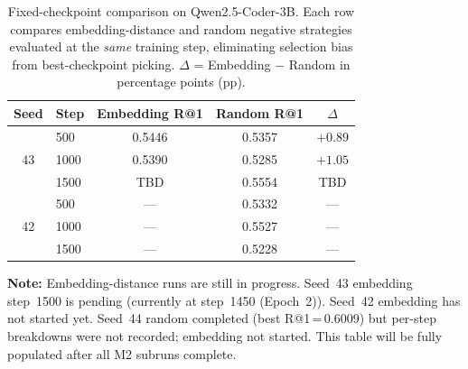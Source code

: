 %

\begin{table}[t]
\centering
\caption{Fixed-checkpoint comparison on Qwen2.5-Coder-3B. Each row compares
  embedding-distance and random negative strategies evaluated at the \emph{same}
  training step, eliminating selection bias from best-checkpoint picking.
  $\Delta$ = Embedding $-$ Random in percentage points (pp).}
\label{tab:fixed-checkpoint}
\begin{tabular}{cl ccc}
\toprule
Seed & Step & Embedding R@1 & Random R@1 & $\Delta$ \\
\midrule
\multirow{3}{*}{43}
  & 500  & 0.5446 & 0.5357 & $+0.89$ \\
  & 1000 & 0.5390 & 0.5285 & $+1.05$ \\
  & 1500 & TBD    & 0.5554 & TBD     \\
\midrule
\multirow{3}{*}{42}
  & 500  & ---    & 0.5332 & ---     \\
  & 1000 & ---    & 0.5527 & ---     \\
  & 1500 & ---    & 0.5228 & ---     \\
\bottomrule
\end{tabular}

\vspace{2pt}
{\footnotesize
\textbf{Note:} Embedding-distance runs are still in progress.
Seed~43 embedding step~1500 is pending (currently at step~1450 (Epoch~2)).
Seed~42 embedding has not started yet.
Seed~44 random completed (best R@1\,=\,0.6009) but per-step breakdowns
were not recorded; embedding not started.
This table will be fully populated after all M2 subruns complete.
}
\end{table}
